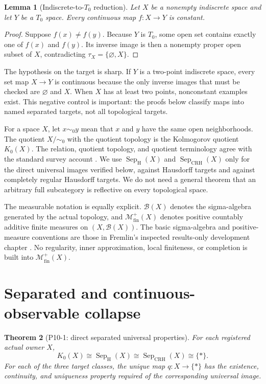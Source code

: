 \documentclass[11pt]{article}
\newtheorem{theorem}{Theorem}[section]
\newtheorem{lemma}[theorem]{Lemma}
\theoremstyle{definition}
\newcommand{\Borel}{\mathcal B}
\newcommand{\Mfin}{\mathcal M_{\mathrm{fin}}^+}
\newcommand{\Kzero}{K_0}
\newcommand{\SepH}{\operatorname{Sep}_{\mathrm H}}
\newcommand{\SepCRH}{\operatorname{Sep}_{\mathrm{CRH}}}
\begin{document}
\begin{lemma}[Indiscrete-to-$T_0$ reduction]
\label{lem:t0}
Let $X$ be a nonempty indiscrete space and let $Y$ be a $T_0$ space.  Every continuous map $f:X\to Y$ is constant.
\end{lemma}

\begin{proof}
Suppose $f(x)\ne f(y)$.  Because $Y$ is $T_0$, some open set contains exactly one of $f(x)$ and $f(y)$.  Its inverse image is then a nonempty proper open subset of $X$, contradicting $\tau_X=\{\varnothing,X\}$.
\end{proof}

The hypothesis on the target is sharp.  If $Y$ is a two-point indiscrete space, every set map $X\to Y$ is continuous because the only inverse images that must be checked are $\varnothing$ and $X$.  When $X$ has at least two points, nonconstant examples exist.  This negative control is important: the proofs below classify maps into named separated targets, not all topological targets.

For a space $X$, let $x\sim_0y$ mean that $x$ and $y$ have the same open neighborhoods.  The quotient $X/{\sim_0}$ with the quotient topology is the Kolmogorov quotient $\Kzero(X)$.  The relation, quotient topology, and quotient terminology agree with the standard survey account \cite[physical pp.~4--6, 9, and 12--13]{Pirttimaki2021}.  We use $\SepH(X)$ and $\SepCRH(X)$ only for the direct universal images verified below, against Hausdorff targets and against completely regular Hausdorff targets.  We do not need a general theorem that an arbitrary full subcategory is reflective on every topological space.

The measurable notation is equally explicit.  $\Borel(X)$ denotes the sigma-algebra generated by the actual topology, and $\Mfin(X)$ denotes positive countably additive finite measures on $(X,\Borel(X))$.  The basic sigma-algebra and positive-measure conventions are those in Fremlin's inspected results-only development chapter \cite[physical pp.~4--6 of Chapter~11]{FremlinMeasureCh11Dev}.  No regularity, inner approximation, local finiteness, or completion is built into $\Mfin(X)$.

\section{Separated and continuous-observable collapse}
\label{sec:continuous}

\begin{theorem}[P10-1: direct separated universal properties]
\label{thm:reflections}
For each registered actual owner $X$,
\[
 \Kzero(X)\cong\SepH(X)\cong\SepCRH(X)\cong\{*\}.
\]
For each of the three target classes, the unique map $q:X\to\{*\}$ has the existence, continuity, and uniqueness property required of the corresponding universal image.
\end{theorem}
\end{document}
